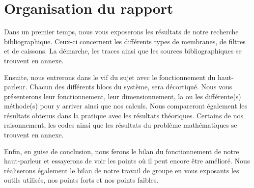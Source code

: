\section{Organisation du rapport}

Dans un premier temps, nous vous exposerons les résultats de notre recherche bibliographique. Ceux-ci concernent les différents types de membranes, de filtres et de caissons. La démarche, les traces ainsi que les sources bibliographiques se trouvent en annexe.

Ensuite, nous entrerons dans le vif du sujet avec le fonctionnement du haut-parleur. Chacun des différents blocs du système, sera décortiqué. Nous vous présenterons leur fonctionnement, leur dimensionnement, la ou les différente(s) méthode(s) pour y arriver ainsi que nos calculs. Nous compareront également les résultats obtenus dans la pratique avec les résultats théoriques. Certains de nos raisonnement, les codes ainsi que les résultats du problème mathématiques se trouvent en annexe.

Enfin, en guise de conclusion, nous ferons le bilan du fonctionnement de notre haut-parleur et essayerons de voir les points où il peut encore être amélioré. Nous réaliserons également le bilan de notre travail de groupe en vous exposants les outils utilisés, nos points forts et nos points faibles.